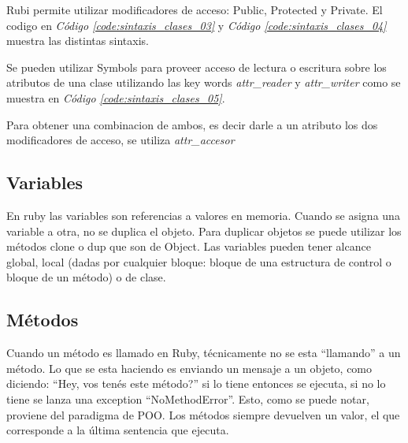 \documentclass{article}
\newcommand{\refcode}[1]{\textit{Código \ref{#1}}}
\begin{document}
 
\bigskip

Rubi permite utilizar modificadores de acceso: Public, Protected y Private. El codigo en \refcode{code:sintaxis_clases_03} y \refcode{code:sintaxis_clases_04} muestra las distintas sintaxis.

 
\bigskip

 
\bigskip

Se pueden utilizar Symbols para proveer acceso de lectura o escritura sobre los atributos de una clase utilizando las key words \textit{attr\_reader} y \textit{attr\_writer} como se muestra en \refcode{code:sintaxis_clases_05}.   

 
\bigskip

Para obtener una combinacion de ambos, es decir darle a un atributo los dos modificadores de acceso, se utiliza \textit{attr\_accesor}
\bigskip



\subsection{Variables}
En ruby las variables son referencias a valores en memoria. Cuando se asigna una variable a otra, no se duplica el objeto. Para duplicar objetos se puede utilizar los métodos clone o dup que son de Object.
Las variables pueden tener alcance global, local (dadas por cualquier bloque: bloque de una estructura de control o bloque de un método) o de clase.

 
\bigskip



\subsection{Métodos}

Cuando un método es llamado en Ruby, técnicamente no se esta “llamando” a un método. Lo que se esta haciendo es enviando un mensaje a un objeto, como diciendo: “Hey, vos tenés este método?” si lo tiene entonces se ejecuta, si no lo tiene se lanza una exception “NoMethodError”. Esto, como se puede notar, proviene del paradigma de POO.
Los métodos siempre devuelven un valor, el que corresponde a la última sentencia que ejecuta. 
\end{document}
